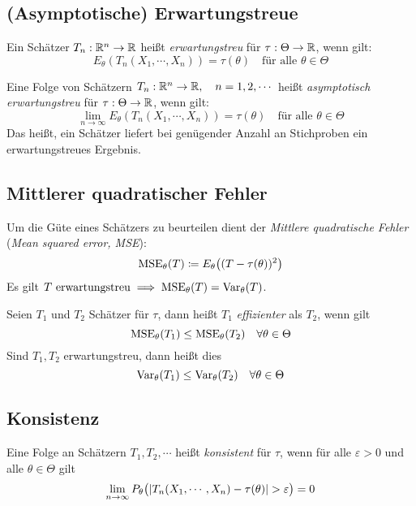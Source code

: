 		\subsection{(Asymptotische) Erwartungstreue}
			Ein Schätzer \( T_n : \mathbb{R}^n \rightarrow \mathbb{R} \) heißt \textit{erwartungstreu} für \( \tau : \Theta \rightarrow \mathbb{R} \), wenn gilt:
			\begin{equation*}
				E_\theta(T_n(X_1, \cdots, X_n)) = \tau(\theta) \quad \textrm{für alle } \theta \in \Theta
			\end{equation*}
			
			Eine Folge von Schätzern \( T_n : \mathbb{R}^n \rightarrow \mathbb{R}, \quad n = 1, 2, \cdots \) heißt \textit{asymptotisch erwartungstreu} für \( \tau : \Theta \rightarrow \mathbb{R} \), wenn gilt:
			\begin{equation*}
				\lim\limits_{n \rightarrow \infty} E_\theta(T_n(X_1, \cdots, X_n)) = \tau(\theta) \quad \textrm{für alle } \theta \in \Theta
			\end{equation*}
			Das heißt, ein Schätzer liefert bei genügender Anzahl an Stichproben ein erwartungstreues Ergebnis.

        \subsection{Mittlerer quadratischer Fehler}
            Um die Güte eines Schätzers zu beurteilen dient der \textit{Mittlere quadratische Fehler} (\textit{Mean squared error, MSE}):
            \begin{eqnarray}
                \operatorname{MSE}_\theta(T) \coloneqq E_\theta\big((T - \tau(\theta))^2\big)
            \end{eqnarray}
            Es gilt \( T \textrm{ erwartungstreu} \implies \operatorname{MSE}_\theta(T) = \operatorname{Var}_\theta(T) \).
            
            Seien \( T_1 \) und \(T_2\) Schätzer für \(\tau\), dann heißt \(T_1\) \textit{effizienter} als \(T_2\), wenn gilt
            \begin{equation*}
                \operatorname{MSE}_\theta(T_1) \leq \operatorname{MSE}_\theta(T_2) \quad \forall \theta \in \Theta
            \end{equation*}
            Sind \( T_1, T_2 \) erwartungstreu, dann heißt dies
            \begin{equation*}
                \operatorname{Var}_\theta(T_1) \leq \operatorname{Var}_\theta(T_2) \quad \forall \theta \in \Theta
            \end{equation*}

        \subsection{Konsistenz}
            Eine Folge an Schätzern \( T_1, T_2, \cdots \) heißt \textit{konsistent} für \(\tau\), wenn für alle \(\varepsilon > 0\) und alle \(\theta \in \Theta\) gilt
            \begin{equation*}
                \lim\limits_{n \rightarrow \infty} P_\theta\big( \abs{T_n(X_1, \cdots, X_n) - \tau(\theta)} > \varepsilon \big) = 0
            \end{equation*}
            
